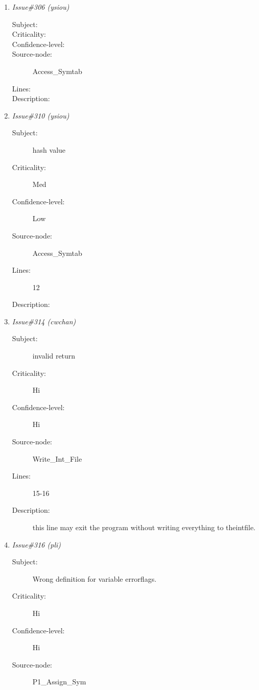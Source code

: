 \begin{enumerate}
\begin{description}
\item [Lines:] 25-27

\item [Description:] eventhough ERRORSFOUND was true, values in
ERRORFLAGS are not written.
\end{description}
\item {\it Issue\#306 (ysiou)}
\begin{description}
\item [Subject:] 
\item [Criticality:] 
\item [Confidence-level:] 
\item [Source-node:] Access\_Symtab

\item [Lines:] 

\item [Description:] 
\end{description}
\item {\it Issue\#310 (ysiou)}
\begin{description}
\item [Subject:] hash value
\item [Criticality:] Med
\item [Confidence-level:] Low
\item [Source-node:] Access\_Symtab

\item [Lines:] 12

\item [Description:] 
\end{description}
\item {\it Issue\#314 (cwchan)}
\begin{description}
\item [Subject:] invalid return
\item [Criticality:] Hi
\item [Confidence-level:] Hi
\item [Source-node:] Write\_Int\_File

\item [Lines:] 15-16

\item [Description:] this line may exit the program without writing
everything to theintfile.
\end{description}
\item {\it Issue\#316 (pli)}
\begin{description}
\item [Subject:] Wrong definition for variable errorflags.
\item [Criticality:] Hi
\item [Confidence-level:] Hi
\item [Source-node:] P1\_Assign\_Sym


\end{description}
\end{enumerate}
